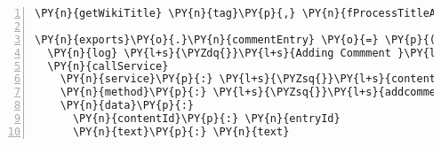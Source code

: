 \begin{Verbatim}[fontsize=\scriptsize,commandchars=\\\{\},numbers=left,firstnumber=1,stepnumber=1]
    \PY{n}{getWikiTitle} \PY{n}{tag}\PY{p}{,} \PY{n}{fProcessTitleAnswer} \PY{n}{tag}

\PY{n}{exports}\PY{o}{.}\PY{n}{commentEntry} \PY{o}{=} \PY{p}{(} \PY{n}{entryId}\PY{p}{,} \PY{n}{text} \PY{p}{)} \PY{o}{\PYZhy{}}\PY{o}{\PYZgt{}}
  \PY{n}{log} \PY{l+s}{\PYZdq{}}\PY{l+s}{Adding Commment }\PY{l+s}{\PYZsq{}}\PY{l+s}{\PYZsh{}\PYZob{} text \PYZcb{}}\PY{l+s}{\PYZsq{}}\PY{l+s}{ to \PYZsh{}\PYZsh{}\PYZob{} entryId \PYZcb{}}\PY{l+s}{\PYZdq{}}
  \PY{n}{callService}
    \PY{n}{service}\PY{p}{:} \PY{l+s}{\PYZsq{}}\PY{l+s}{content}\PY{l+s}{\PYZsq{}}
    \PY{n}{method}\PY{p}{:} \PY{l+s}{\PYZsq{}}\PY{l+s}{addcomment}\PY{l+s}{\PYZsq{}}
    \PY{n}{data}\PY{p}{:}
      \PY{n}{contentId}\PY{p}{:} \PY{n}{entryId}
      \PY{n}{text}\PY{p}{:} \PY{n}{text}
\end{Verbatim}



\clearpage
